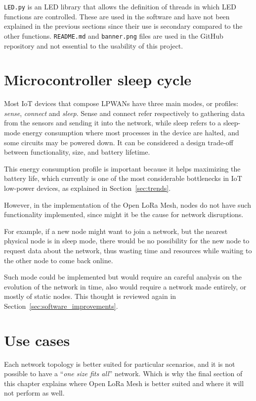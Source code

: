 		\texttt{LED.py} is an LED library that allows the definition of threads in which LED functions are controlled.
		These are used in the software and have not been explained in the previous sections since their use is secondary compared to the other functions.
		\texttt{README.md} and \texttt{banner.png} files are used in the GitHub repository and not essential to the usability of this project.
		
	\section{Microcontroller sleep cycle}\label{sec:sleep}
	
		Most IoT devices that compose LPWANs have three main modes, or profiles: \textit{sense}, \textit{connect} and \textit{sleep}.
		Sense and connect refer respectively to gathering data from the sensors and sending it into the network, while sleep refers to a sleep-mode energy consumption where most processes in the device are halted, and some circuits may be powered down.
		It can be considered a design trade-off between functionality, size, and battery lifetime.
		
		This energy consumption profile is important because it helps maximizing the battery life, which currently is one of the most considerable bottlenecks in IoT low-power devices, as explained in Section~\ref{sec:trends}.
		
		However, in the implementation of the Open LoRa Mesh, nodes do not have such functionality implemented, since might it be the cause for network disruptions.
		
		For example, if a new node might want to join a network, but the nearest physical node is in sleep mode, there would be no possibility for the new node to request data about the network, thus wasting time and resources while waiting to the other node to come back online.
		
		Such mode could be implemented but would require an careful analysis on the evolution of the network in time, also would require a network made entirely, or mostly of static nodes.
		This thought is reviewed again in Section~\ref{sec:software_improvements}.
			
	\section{Use cases}
		
		Each network topology is better suited for particular scenarios, and it is not possible to have a ``\textit{one size fits all}'' network.
		Which is why the final section of this chapter explains where Open LoRa Mesh is better suited and where it will not perform as well.
		
